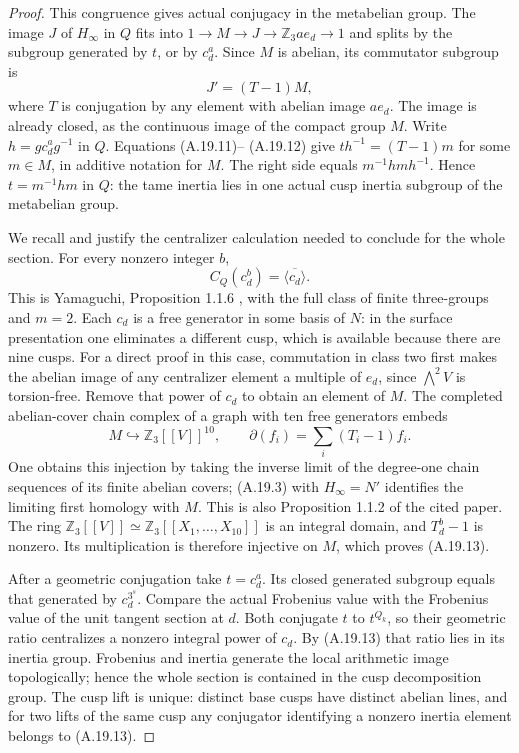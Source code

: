 \begin{proof}
This congruence gives actual conjugacy in the metabelian
group. The image $J$ of $H_\infty$ in $Q$ fits into
$1\to M\to J\to\mathbb Z_3a e_d\to1$ and splits
by the subgroup generated by $t$, or by $c_d^a$.
Since $M$ is abelian, its commutator subgroup is
\[
 J'=(T-1)M,
 \tag{A.19.12}
\]
where $T$ is conjugation by any element with abelian
image $a e_d$. The image is already closed, as the
continuous image of the compact group $M$. Write
$h=g c_d^a g^{-1}$ in $Q$. Equations (A.19.11)--
(A.19.12) give $t h^{-1}=(T-1)m$ for some $m\in M$,
in additive notation for $M$. The right side equals
$m^{-1}h m h^{-1}$. Hence $t=m^{-1}h m$ in $Q$:
the tame inertia lies in one actual cusp inertia
subgroup of the metabelian group.

We recall and justify the centralizer calculation
needed to conclude for the whole section. For every
nonzero integer $b$,
\[
                    C_Q(c_d^b)=\overline{\langle c_d\rangle}.
 \tag{A.19.13}
\]
This is Yamaguchi, Proposition 1.1.6
\cite{AYamaguchi2023}, with the full class of finite
three-groups and $m=2$. Each $c_d$ is a free generator
in some basis of $N$: in the surface presentation one
eliminates a different cusp, which is available because
there are nine cusps. For a direct proof in this case,
commutation in class two first makes the abelian image
of any centralizer element a multiple of $e_d$, since
$\bigwedge^2V$ is torsion-free. Remove that power of
$c_d$ to obtain an element of $M$. The completed
abelian-cover chain complex of a graph with ten free
generators embeds
\[
 M\hookrightarrow\mathbb Z_3[[V]]^{10},
 \qquad \partial(f_i)=\sum_i(T_i-1)f_i.
\]
One obtains this injection by taking the inverse limit
of the degree-one chain sequences of its finite
abelian covers; (A.19.3) with $H_\infty=N'$ identifies
the limiting first homology with $M$. This is also
Proposition 1.1.2 of the cited paper. The ring
$\mathbb Z_3[[V]]\simeq\mathbb Z_3[[X_1,\ldots,X_{10}]]$
is an integral domain, and $T_d^b-1$ is nonzero.
Its multiplication is therefore injective on $M$,
which proves (A.19.13).

After a geometric conjugation take $t=c_d^a$.
Its closed generated subgroup equals that generated
by $c_d^{3^s}$. Compare the actual Frobenius value
with the Frobenius value of the unit tangent section
at $d$. Both conjugate $t$ to $t^{Q_k}$, so their
geometric ratio centralizes a nonzero integral power
of $c_d$. By (A.19.13) that ratio lies in its inertia
group. Frobenius and inertia generate the local
arithmetic image topologically; hence the whole
section is contained in the cusp decomposition group.
The cusp lift is unique: distinct base cusps have
distinct abelian lines, and for two lifts of the same
cusp any conjugator identifying a nonzero inertia
element belongs to (A.19.13).


\end{proof}
